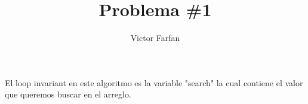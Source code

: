 \documentclass{article}
\begin{document}
\title{Problema \#1}
\author{Victor Farfan}
\maketitle
	\begin{algorithm}[H]
	\end{algorithm}
		
\newenvironment{answer}
\begin{answer}
El loop invariant en este algoritmo es la variable "search" la cual contiene el valor que queremos buscar en el arreglo.
\end{document}
